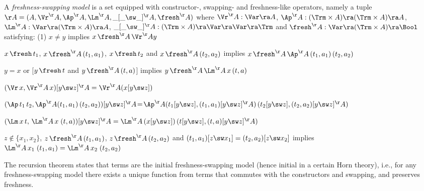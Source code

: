 %
A \emph{freshness-swapping model} is a set equipped with constructor-, swapping- and freshness-like operators, namely a tuple $\AA = (A,\Vr^\AA,\Ap^\AA,\Lm^\AA,\_[\_\sw\_]^\AA,\fresh^\AA)$ where 
$\Vr^\AA : \Var \ra A$, 
$\Ap^\AA : (\Trm \times A) \ra (\Trm \times A) \ra A$, 
$\Lm^\AA : \Var \ra (\Trm \times A) \ra A$, 
$\_[\_\sw\_]^\AA : (\Trm \times A) \ra \Var \ra \Var \ra \Trm$ 
and 
$\fresh^\AA : \Var \ra (\Trm \times A) \ra \Bool$
satisfying: \hspace*{8ex}%
(1) $x \not= y$ implies $x \,\fresh^\AA\, \Vr^\AA y$\
\begin{mmmyitem}
	\item[(2)] $x \,\fresh\, t_1$, 
	$x  \,\fresh^\AA\,(t_1,a_1)$, 
	$x \,\fresh\, t_2$ and 
	$x \,\fresh^\AA\,(t_2,a_2)$ implies 
	$x \,\fresh^\AA\, \Ap^\AA\,(t_1,a_1)\,(t_2,a_2)$
	\item[(3)] $y = x$  
	or [$y \,\fresh\, t$ and $y  \,\fresh^\AA\,(t,a)$] 
	implies 
	$y \,\fresh^\AA\, \Lm^\AA\,x\,(t,a)$
	\item[(4)] $(\Vr\,x,\Vr^\AA\,x)[y \sw z]^\AA = \Vr^\AA(x[y \sw z])$ 
\item[(5)] $(\Ap\,t_1\,t_2, \Ap^\AA(t_1,a_1)\,(t_2,a_2))[y \sw z]^\AA \!=\! \Ap^\AA(t_1[y \sw z],(t_1,a_1)[y \sw z]^\AA)\,
(t_2[y \sw z],(t_2,a_2)[y \sw z]^\AA)$
%
\item[(6)] $(\Lm\,x\,t,\,\Lm^\AA\,x\;(t,a))[y \sw z]^\AA = 
\Lm^\AA\,(x[y \sw z])\,(t[y \sw z],(t,a)[y \sw z]^\AA)$
%
%
\item[(7)] $z \not\in \{x_1,x_2\}$, 
$z \,\fresh^\AA\,(t_1,a_1)$, $z\,\fresh^\AA\,(t_2,a_2)$ 
and 
$(t_1,a_1)[z \sw x_1] = (t_2,a_2)[z \sw x_2]$  
implies 
\\$\Lm^\AA\,x_1\;(t_1,a_1) = \Lm^\AA\,x_2\;(t_2,a_2)$
\end{mmmyitem}

The %
recursion theorem states that terms are the initial freshness-swapping model 
(hence initial in a certain Horn theory), i.e., for any freshness-swapping model there exists a unique function from terms that commutes with the constructors and %
swapping,   
and preserves freshness.

